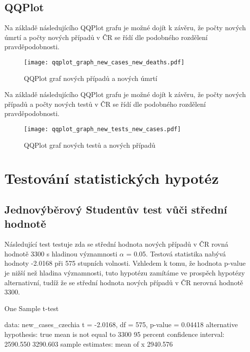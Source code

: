 \documentclass[a4paper, 12pt]{article}
\begin{document}
\subsection{QQPlot}

Na základě následujícího QQPlot grafu je možné dojít k závěru, že počty nových
úmrtí a počty nových případů v ČR se řídí dle podobného rozdělení pravděpodobnosti.

\begin{figure}[H]
\centering

\texttt{[image: qqplot\_graph\_new\_cases\_new\_deaths.pdf]}
\caption{QQPlot graf nových případů a nových úmrtí}
\end{figure}
\clearpage

Na základě následujícího QQPlot grafu je možné dojít k závěru, že počty nových
případů a počty nových testů v ČR se řídí dle podobného rozdělení pravděpodobnosti.

\begin{figure}[H]
\centering

\texttt{[image: qqplot\_graph\_new\_tests\_new\_cases.pdf]}
\caption{QQPlot graf nových testů a nových případů}

\end{figure}
\clearpage

\section{Testování statistických hypotéz}

\subsection{Jednovýběrový Studentův test vůči střední hodnotě}
Následující test testuje zda se střední hodnota nových případů v ČR rovná
hodnotě 3300 s hladinou významnosti $\alpha$ = 0.05. Testová statistika nabývá hodnoty -2.0168 při 575 stupních volnosti. Vzhledem k tomu, že hodnota p-value je nižší než hladina významnosti, tuto hypotézu zamítáme ve prospěch hypotézy alternativní, tudíž že se střední hodnota
nových případů v ČR nerovná hodnotě 3300.

\begin{Schunk}
\begin{Soutput}
	One Sample t-test

data:  new_cases_czechia
t = -2.0168, df = 575, p-value = 0.04418
alternative hypothesis: true mean is not equal to 3300
95 percent confidence interval:
 2590.550 3290.603
sample estimates:
mean of x 
 2940.576 
\end{Soutput}
\end{Schunk}
\end{document}
